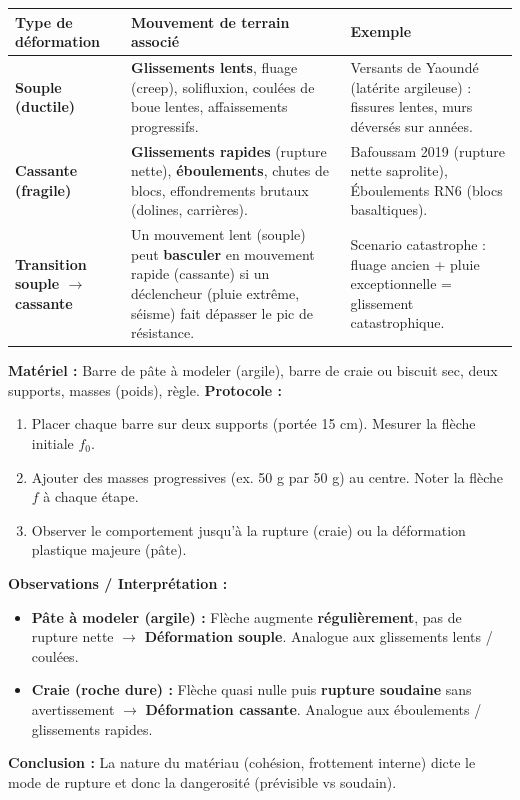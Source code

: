 \documentclass[11pt]{article}
\begin{document}
\begin{propriete}
\begin{center}
\begin{tabularx}{\linewidth}{|l|X|X|}\hline
\rowcolor{popblueL}
\textbf{Type de déformation} & \textbf{Mouvement de terrain associé} & \textbf{Exemple} \\ \hline
\textbf{Souple (ductile)} & \textbf{Glissements lents}, fluage (creep), solifluxion, coulées de boue lentes, affaissements progressifs. & Versants de Yaoundé (latérite argileuse) : fissures lentes, murs déversés sur années. \\ \hline
\textbf{Cassante (fragile)} & \textbf{Glissements rapides} (rupture nette), \textbf{éboulements}, chutes de blocs, effondrements brutaux (dolines, carrières). & Bafoussam 2019 (rupture nette saprolite), Éboulements RN6 (blocs basaltiques). \\ \hline
\textbf{Transition souple $\rightarrow$ cassante} & Un mouvement lent (souple) peut \textbf{basculer} en mouvement rapide (cassante) si un déclencheur (pluie extrême, séisme) fait dépasser le pic de résistance. & Scenario catastrophe : fluage ancien + pluie exceptionnelle = glissement catastrophique. \\ \hline
\end{tabularx}
\end{center}
\end{propriete}

\begin{experience}
\textbf{Matériel :} Barre de pâte à modeler (argile), barre de craie ou biscuit sec, deux supports, masses (poids), règle.
\textbf{Protocole :}
\begin{enumerate}
    \item Placer chaque barre sur deux supports (portée 15 cm). Mesurer la flèche initiale $f_0$.
    \item Ajouter des masses progressives (ex. 50 g par 50 g) au centre. Noter la flèche $f$ à chaque étape.
    \item Observer le comportement jusqu'à la rupture (craie) ou la déformation plastique majeure (pâte).
\end{enumerate}
\textbf{Observations / Interprétation :}
\begin{itemize}
    \item \textbf{Pâte à modeler (argile) :} Flèche augmente \textbf{régulièrement}, pas de rupture nette $\rightarrow$ \textbf{Déformation souple}. Analogue aux glissements lents / coulées.
    \item \textbf{Craie (roche dure) :} Flèche quasi nulle puis \textbf{rupture soudaine} sans avertissement $\rightarrow$ \textbf{Déformation cassante}. Analogue aux éboulements / glissements rapides.
\end{itemize}
\textbf{Conclusion :} La nature du matériau (cohésion, frottement interne) dicte le mode de rupture et donc la dangerosité (prévisible vs soudain).
\end{experience}
\end{document}
